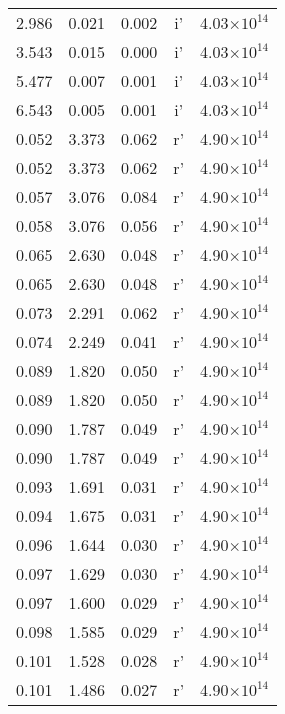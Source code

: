 \documentclass{aa}
\begin{document}
{\begin{longtable}{c|c|c|c|c}
  2.986 &   0.021 &  0.002 & i'        &  4.03$\times 10^{14}$    \\
  3.543 &   0.015 &  0.000 & i'        &  4.03$\times 10^{14}$    \\
  5.477 &   0.007 &  0.001 & i'        &  4.03$\times 10^{14}$    \\
  6.543 &   0.005 &  0.001 & i'        &  4.03$\times 10^{14}$    \\
  0.052 &   3.373 &  0.062 & r'        &  4.90$\times 10^{14}$    \\  
  0.052 &   3.373 &  0.062 & r'        &  4.90$\times 10^{14}$    \\
  0.057 &   3.076 &  0.084 & r'        &  4.90$\times 10^{14}$    \\
  0.058 &   3.076 &  0.056 & r'        &  4.90$\times 10^{14}$    \\
  0.065 &   2.630 &  0.048 & r'        &  4.90$\times 10^{14}$    \\
  0.065 &   2.630 &  0.048 & r'        &  4.90$\times 10^{14}$    \\
  0.073 &   2.291 &  0.062 & r'        &  4.90$\times 10^{14}$    \\
  0.074 &   2.249 &  0.041 & r'        &  4.90$\times 10^{14}$    \\
  0.089 &   1.820 &  0.050 & r'        &  4.90$\times 10^{14}$    \\
  0.089 &   1.820 &  0.050 & r'        &  4.90$\times 10^{14}$    \\
  0.090 &   1.787 &  0.049 & r'        &  4.90$\times 10^{14}$    \\
  0.090 &   1.787 &  0.049 & r'        &  4.90$\times 10^{14}$    \\
  0.093 &   1.691 &  0.031 & r'        &  4.90$\times 10^{14}$    \\
  0.094 &   1.675 &  0.031 & r'        &  4.90$\times 10^{14}$    \\
  0.096 &   1.644 &  0.030 & r'        &  4.90$\times 10^{14}$    \\
  0.097 &   1.629 &  0.030 & r'        &  4.90$\times 10^{14}$    \\
  0.097 &   1.600 &  0.029 & r'        &  4.90$\times 10^{14}$    \\
  0.098 &   1.585 &  0.029 & r'        &  4.90$\times 10^{14}$    \\
  0.101 &   1.528 &  0.028 & r'        &  4.90$\times 10^{14}$    \\
  0.101 &   1.486 &  0.027 & r'        &  4.90$\times 10^{14}$    \\

\end{longtable}}
\end{document}
